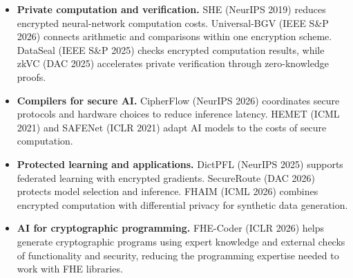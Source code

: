 \begin{itemize}
\item \textbf{Private computation and verification.} SHE (NeurIPS 2019) reduces encrypted neural-network computation costs. Universal-BGV (IEEE S\&P 2026) connects arithmetic and comparisons within one encryption scheme. DataSeal (IEEE S\&P 2025) checks encrypted computation results, while zkVC (DAC 2025) accelerates private verification through zero-knowledge proofs.
\item \textbf{Compilers for secure AI.} CipherFlow (NeurIPS 2026) coordinates secure protocols and hardware choices to reduce inference latency. HEMET (ICML 2021) and SAFENet (ICLR 2021) adapt AI models to the costs of secure computation.
\item \textbf{Protected learning and applications.} DictPFL (NeurIPS 2025) supports federated learning with encrypted gradients. SecureRoute (DAC 2026) protects model selection and inference. FHAIM (ICML 2026) combines encrypted computation with differential privacy for synthetic data generation.
\item \textbf{AI for cryptographic programming.} FHE-Coder (ICLR 2026) helps generate cryptographic programs using expert knowledge and external checks of functionality and security, reducing the programming expertise needed to work with FHE libraries.
\end{itemize}
